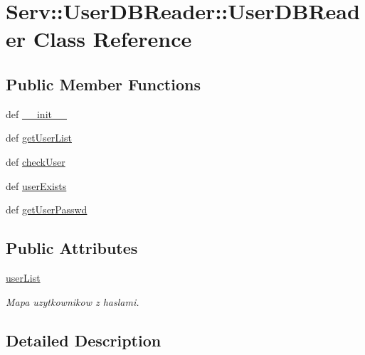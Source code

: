 \hypertarget{class_serv_1_1_user_d_b_reader_1_1_user_d_b_reader}{
\section{Serv::UserDBReader::UserDBReader Class Reference}
\label{class_serv_1_1_user_d_b_reader_1_1_user_d_b_reader}
}
\subsection*{Public Member Functions}
\begin{CompactItemize}
\item 
def \hyperlink{class_serv_1_1_user_d_b_reader_1_1_user_d_b_reader_f3811b4b6123fe47153f9d87631322a9}{\_\-\_\-init\_\-\_\-}
\item 
def \hyperlink{class_serv_1_1_user_d_b_reader_1_1_user_d_b_reader_84890922ae8efd8ecec178874ec296f6}{getUserList}
\item 
def \hyperlink{class_serv_1_1_user_d_b_reader_1_1_user_d_b_reader_1fa47b601f3968090cf56b959f50ca94}{checkUser}
\item 
def \hyperlink{class_serv_1_1_user_d_b_reader_1_1_user_d_b_reader_e3a006e064956d5d09ad1bcaa4c3315f}{userExists}
\item 
def \hyperlink{class_serv_1_1_user_d_b_reader_1_1_user_d_b_reader_d77c35dbbb9ddf154ab8809463a254c0}{getUserPasswd}
\end{CompactItemize}
\subsection*{Public Attributes}
\begin{CompactItemize}
\item 
\hypertarget{class_serv_1_1_user_d_b_reader_1_1_user_d_b_reader_69dbf266bd3f0f66f21f30d5bd5fef82}{
\hyperlink{class_serv_1_1_user_d_b_reader_1_1_user_d_b_reader_69dbf266bd3f0f66f21f30d5bd5fef82}{userList}}
\label{class_serv_1_1_user_d_b_reader_1_1_user_d_b_reader_69dbf266bd3f0f66f21f30d5bd5fef82}

\begin{CompactList}\small\item\em Mapa uzytkownikow z haslami. \item\end{CompactList}\end{CompactItemize}


\subsection{Detailed Description}


